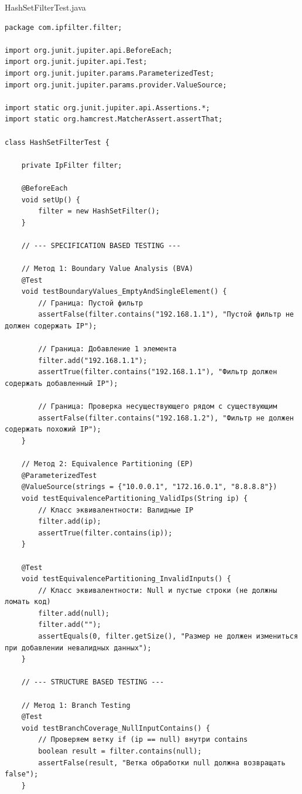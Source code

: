 HashSetFilterTest.java
\begin{verbatim}
package com.ipfilter.filter;

import org.junit.jupiter.api.BeforeEach;
import org.junit.jupiter.api.Test;
import org.junit.jupiter.params.ParameterizedTest;
import org.junit.jupiter.params.provider.ValueSource;

import static org.junit.jupiter.api.Assertions.*;
import static org.hamcrest.MatcherAssert.assertThat;

class HashSetFilterTest {

    private IpFilter filter;

    @BeforeEach
    void setUp() {
        filter = new HashSetFilter();
    }

    // --- SPECIFICATION BASED TESTING ---

    // Метод 1: Boundary Value Analysis (BVA)
    @Test
    void testBoundaryValues_EmptyAndSingleElement() {
        // Граница: Пустой фильтр
        assertFalse(filter.contains("192.168.1.1"), "Пустой фильтр не должен содержать IP");

        // Граница: Добавление 1 элемента
        filter.add("192.168.1.1");
        assertTrue(filter.contains("192.168.1.1"), "Фильтр должен содержать добавленный IP");

        // Граница: Проверка несуществующего рядом с существующим
        assertFalse(filter.contains("192.168.1.2"), "Фильтр не должен содержать похожий IP");
    }

    // Метод 2: Equivalence Partitioning (EP)
    @ParameterizedTest
    @ValueSource(strings = {"10.0.0.1", "172.16.0.1", "8.8.8.8"})
    void testEquivalencePartitioning_ValidIps(String ip) {
        // Класс эквивалентности: Валидные IP
        filter.add(ip);
        assertTrue(filter.contains(ip));
    }

    @Test
    void testEquivalencePartitioning_InvalidInputs() {
        // Класс эквивалентности: Null и пустые строки (не должны ломать код)
        filter.add(null);
        filter.add("");
        assertEquals(0, filter.getSize(), "Размер не должен измениться при добавлении невалидных данных");
    }

    // --- STRUCTURE BASED TESTING ---

    // Метод 1: Branch Testing
    @Test
    void testBranchCoverage_NullInputContains() {
        // Проверяем ветку if (ip == null) внутри contains
        boolean result = filter.contains(null);
        assertFalse(result, "Ветка обработки null должна возвращать false");
    }


\end{verbatim}
